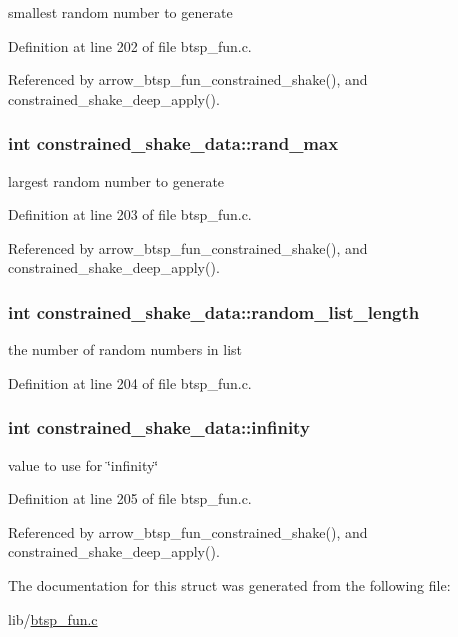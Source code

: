 smallest random number to generate 

Definition at line 202 of file btsp\_\-fun.c.

Referenced by arrow\_\-btsp\_\-fun\_\-constrained\_\-shake(), and constrained\_\-shake\_\-deep\_\-apply().\hypertarget{structconstrained__shake__data_39972f2868c566a04f200957d9ad0c3f}{
\subsubsection{\setlength{\rightskip}{0pt plus 5cm}int {\bf constrained\_\-shake\_\-data::rand\_\-max}}}
\label{structconstrained__shake__data_39972f2868c566a04f200957d9ad0c3f}


largest random number to generate 

Definition at line 203 of file btsp\_\-fun.c.

Referenced by arrow\_\-btsp\_\-fun\_\-constrained\_\-shake(), and constrained\_\-shake\_\-deep\_\-apply().\hypertarget{structconstrained__shake__data_0114e4db38ea88cd199781d7ba97a44b}{
\subsubsection{\setlength{\rightskip}{0pt plus 5cm}int {\bf constrained\_\-shake\_\-data::random\_\-list\_\-length}}}
\label{structconstrained__shake__data_0114e4db38ea88cd199781d7ba97a44b}


the number of random numbers in list 

Definition at line 204 of file btsp\_\-fun.c.\hypertarget{structconstrained__shake__data_ba0c33ec57d7f977911088e41b48c606}{
\subsubsection{\setlength{\rightskip}{0pt plus 5cm}int {\bf constrained\_\-shake\_\-data::infinity}}}
\label{structconstrained__shake__data_ba0c33ec57d7f977911088e41b48c606}


value to use for \char`\"{}infinity\char`\"{} 

Definition at line 205 of file btsp\_\-fun.c.

Referenced by arrow\_\-btsp\_\-fun\_\-constrained\_\-shake(), and constrained\_\-shake\_\-deep\_\-apply().

The documentation for this struct was generated from the following file:\begin{CompactItemize}
\item 
lib/\hyperlink{btsp__fun_8c}{btsp\_\-fun.c}\end{CompactItemize}
